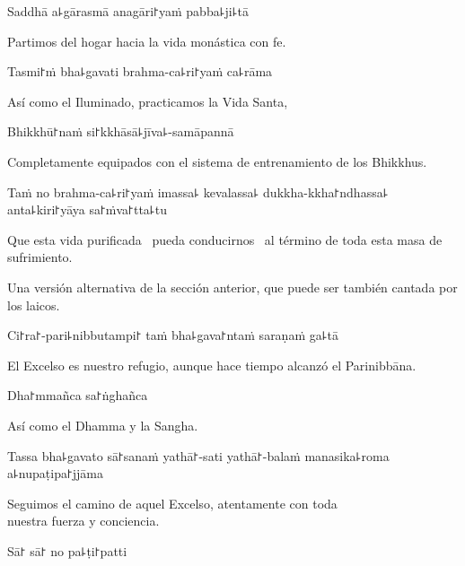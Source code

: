 Saddhā a꜕gārasmā anagāri꜓yaṁ pabba꜕ji꜕tā

\begin{english}
  Partimos del hogar hacia la vida monástica con fe.
\end{english}

Tasmi꜓ṁ bha꜕gavati brahma-ca꜕ri꜓yaṁ ca꜕rāma

\begin{english}
  Así como el Iluminado, practicamos la Vida Santa,
\end{english}

Bhikkhū꜓naṁ si꜓kkhāsā꜕jīva꜕-samāpannā

\begin{english}
  Completamente equipados con el sistema de entrenamiento de los Bhikkhus.
\end{english}

\clearpage

Taṁ no brahma-ca꜕ri꜓yaṁ imassa꜕ kevalassa꜕ dukkha-kkha꜓ndhassa꜕ anta꜕kiri꜓yāya sa꜓ṁva꜓tta꜕tu

\begin{english}
  Que esta vida purificada \pause\ pueda conducirnos \pause\ al término de toda esta masa de sufrimiento.
\end{english}

\begin{instruction}
  Una versión alternativa de la sección anterior, que puede ser también cantada por los laicos.
\end{instruction}

Ci꜓ra꜓-pari꜕nibbutampi꜓ taṁ bha꜕gava꜓ntaṁ saraṇaṁ ga꜕tā

\begin{english}
  El Excelso es nuestro refugio, aunque hace tiempo alcanzó el Parinibbāna. 
\end{english}

Dha꜓mmañca sa꜓ṅghañca

\begin{english}
  Así como el Dhamma y la Sangha.
\end{english}

Tassa bha꜕gavato sā꜓sanaṁ yathā꜓-sati yathā꜓-balaṁ manasika꜕roma a꜕nupaṭipa꜓jjāma

\begin{english}
  Seguimos el camino de aquel Excelso, atentamente con toda\\ nuestra fuerza y conciencia.
\end{english}

Sā꜓ sā꜓ no pa꜕ṭi꜓patti

